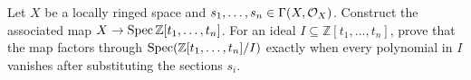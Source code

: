 \begin{problem}\label{chal:vi19-c04}
Let $X$ be a locally ringed space and $s_1,\dots,s_n\in\Gamma(X,\mathcal O_X)$. Construct the associated map $X\to\operatorname{Spec}\mathbb Z[t_1,\dots,t_n]$.  For an ideal $I\subseteq\mathbb Z[t_1,\dots,t_n]$, prove that the map factors through $\operatorname{Spec}(\mathbb Z[t_1,\dots,t_n]/I)$ exactly when every polynomial in $I$ vanishes after substituting the sections $s_i$.
\end{problem}

